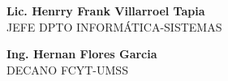 \documentclass[letterpaper,11pt]{article}
\begin{document}
\vspace{4cm}

\begin{minipage}{0.5\textwidth}
\begin{center}
{\bf Lic. Henrry Frank Villarroel Tapia}\\
JEFE DPTO INFORMÁTICA-SISTEMAS\\
\end{center}
\end{minipage}
\begin{minipage}{0.5\textwidth}
\begin{center}
{\bf Ing. Hernan Flores Garcia}\\
DECANO FCYT-UMSS\\
\end{center}
\end{minipage}
\end{document}

